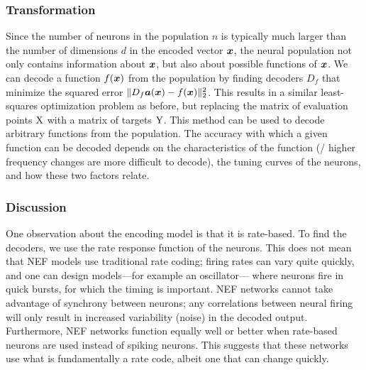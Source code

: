 \subsubsection{Transformation}

Since the number of neurons in the population $n$
is typically much larger than the number of dimensions $d$ in the encoded vector $\boldsymbol{x}$,
the neural population not only contains information about $\boldsymbol{x}$,
but also about possible functions of $\boldsymbol{x}$.
We can decode a function $f(\boldsymbol{x})$ from the population
by finding decoders $D_f$ that minimize the squared error
$\|D_f \boldsymbol{a}(\boldsymbol{x}) - f(\boldsymbol{x})\|_2^2$.
This results in a similar least-squares optimization problem as before,
but replacing the matrix of evaluation points $\mathrm{X}$
with a matrix of targets $\mathrm{Y}$.
This method can be used to decode arbitrary functions from the population.
The accuracy with which a given function can be decoded depends
on the characteristics of the function
(\eg/ higher frequency changes are more difficult to decode),
the tuning curves of the neurons,
and how these two factors relate.


\subsubsection{Discussion}

One observation about the encoding model is that it is rate-based.
To find the decoders, we use the rate response function of the neurons.
This does not mean that NEF models use traditional rate coding;
firing rates can vary quite quickly,
and one can design models---for example an oscillator---%
where neurons fire in quick bursts, for which the timing is important.
NEF networks cannot take advantage of synchrony between neurons;
any correlations between neural firing will only result in
increased variability (noise) in the decoded output.
Furthermore, NEF networks function equally well or better
when rate-based neurons are used instead of spiking neurons.
This suggests that these networks use what is fundamentally a rate code,
albeit one that can change quickly.

